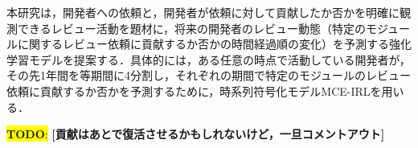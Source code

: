 \documentclass[submit,noauthor,ses,dvipdfmx]{ipsj}
\newcommand{\todo}[1]{\colorbox{yellow}{{\bf TODO}:}{\color{red} {\textbf{[#1]}}}}
\begin{document}

本研究は，開発者への依頼と，開発者が依頼に対して貢献したか否かを明確に観測できるレビュー活動を題材に，将来の開発者のレビュー動態（特定のモジュールに関するレビュー依頼に貢献するか否かの時間経過順の変化）を予測する強化学習モデルを提案する．具体的には，ある任意の時点で活動している開発者が，その先1年間を等期間に4分割し，それぞれの期間で特定のモジュールのレビュー依頼に貢献するか否かを予測するために，時系列符号化モデルMCE-IRLを用いる．






\todo{貢献はあとで復活させるかもしれないけど，一旦コメントアウト}
\end{document}
